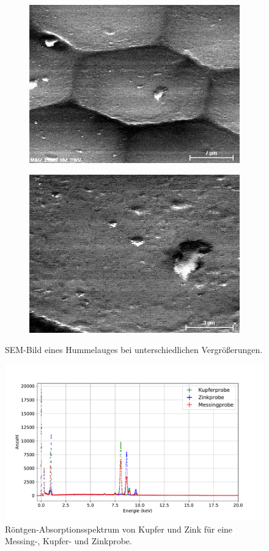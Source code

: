 \begin{figure}[H]
\begin{subfigure}[c]{.45\textwidth}
	\end{subfigure}
	\begin{subfigure}[c]{.45\textwidth}
		\centering
		\includegraphics[width=.8\textwidth]{raw/SEM/Hummelauge_M3500}
	\end{subfigure}
	\begin{subfigure}[c]{.45\textwidth}
		\centering
		\includegraphics[width=.8\textwidth]{raw/SEM/Hummelauge_M9010}
	\end{subfigure}
	\caption{SEM-Bild eines Hummelauges bei unterschiedlichen Vergrößerungen.}
	\label{fig:Hummelauge}
\end{figure}

\begin{figure}[H]
	\centering
	\includegraphics[width=.8\textwidth]{plots/KupferprobeGanz}
	\caption{Röntgen-Absorptionsspektrum von Kupfer und Zink für eine Messing-, Kupfer- und Zinkprobe.}
	\label{fig:messing_spektrum}
\end{figure}

